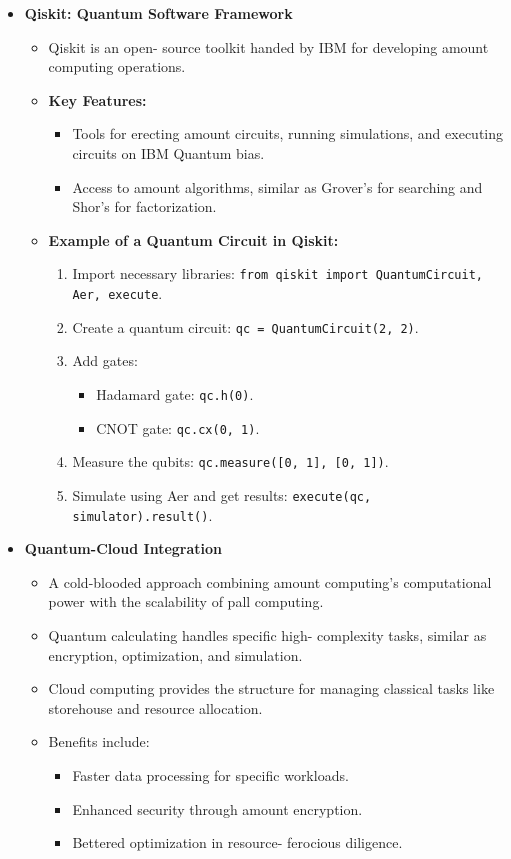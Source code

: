 \documentclass[12pt,a4paper]{article}
\begin{document}
\begin{itemize}
    \item \textbf{Qiskit: Quantum Software Framework}
    \begin{itemize}
        \item Qiskit is an open- source toolkit handed by IBM for developing amount computing operations.
        \item \textbf{Key Features:}
        \begin{itemize}
            \item Tools for erecting amount circuits, running simulations, and executing circuits on IBM Quantum bias.
            \item Access to amount algorithms, similar as Grover's for searching and Shor's for factorization.
        \end{itemize}
        \item \textbf{Example of a Quantum Circuit in Qiskit:}
        \begin{enumerate}
            \item Import necessary libraries: \texttt{from qiskit import QuantumCircuit, Aer, execute}.
            \item Create a quantum circuit: \texttt{qc = QuantumCircuit(2, 2)}.
            \item Add gates:
            \begin{itemize}
                \item Hadamard gate: \texttt{qc.h(0)}.
                \item CNOT gate: \texttt{qc.cx(0, 1)}.
            \end{itemize}
            \item Measure the qubits: \texttt{qc.measure([0, 1], [0, 1])}.
            \item Simulate using Aer and get results: \texttt{execute(qc, simulator).result()}.
        \end{enumerate}
    \end{itemize}

    \item \textbf{Quantum-Cloud Integration}
    \begin{itemize}
        \item A cold-blooded approach combining amount computing's computational power with the scalability of pall computing.
        \item Quantum calculating handles specific high- complexity tasks, similar as encryption, optimization, and simulation.
        \item Cloud computing provides the structure for managing classical tasks like storehouse and resource allocation.
        \item Benefits include:
        \begin{itemize}
            \item Faster data processing for specific workloads.
             \item Enhanced security through amount encryption.
              \item Bettered optimization in resource- ferocious diligence.
        \end{itemize}
    \end{itemize}


\end{itemize}
\end{document}
